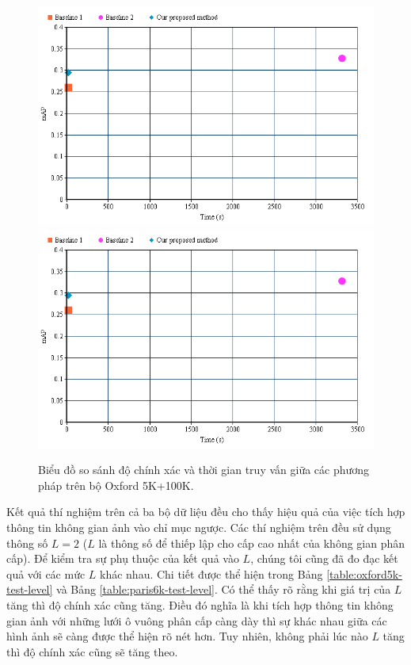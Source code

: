 \begin{figure}[!htbp]
  \begin{center}
    \leavevmode
    \ifpdf
      \includegraphics[scale=0.5]{1_chart}
    \else
      \includegraphics[scale=0.5]{1_chart}
    \fi
    \caption[Biểu đồ so sánh độ chính xác và thời gian truy vấn giữa các phương pháp]{Biểu đồ so sánh độ chính xác và thời gian truy vấn giữa các phương pháp trên bộ Oxford 5K+100K.}
    \label{Fig1Chart}
  \end{center}
\end{figure}


Kết quả thí nghiệm trên cả ba bộ dữ liệu đều cho thấy hiệu quả của việc tích hợp thông tin không gian ảnh vào chỉ mục ngược. Các thí nghiệm trên đều sử dụng thông số $L = 2$ ($L$ là thông số để thiếp lập cho cấp cao nhất của không gian phân cấp). Để kiểm tra sự phụ thuộc của kết quả vào $L$, chúng tôi cũng đã đo đạc kết quả với các mức $L$ khác nhau. Chi tiết được thể hiện trong Bảng \ref{table:oxford5k-test-level} và Bảng \ref{table:paris6k-test-level}. Có thể thấy rõ rằng khi giá trị của $L$ tăng thì độ chính xác cũng tăng. Điều đó nghĩa là khi tích hợp thông tin không gian ảnh với những lưới ô vuông phân cấp càng dày thì sự khác nhau giữa các hình ảnh sẽ càng được thể hiện rõ nét hơn. Tuy nhiên, không phải lúc nào $L$ tăng thì độ chính xác cũng sẽ tăng theo.

